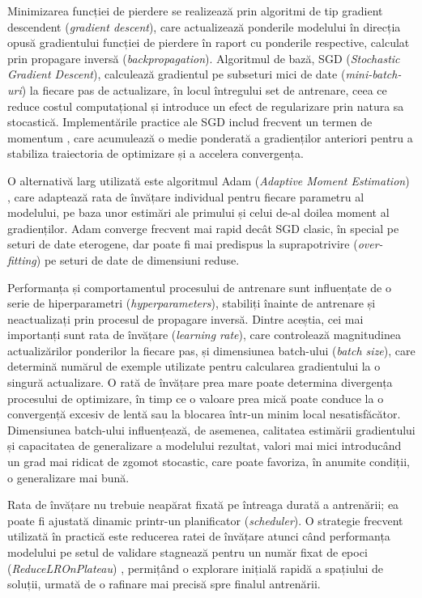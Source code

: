 Minimizarea funcției de pierdere se realizează prin algoritmi de tip gradient descendent (\textit{gradient descent}), care actualizează ponderile modelului în direcția opusă gradientului funcției de pierdere în raport cu ponderile respective, calculat prin propagare inversă (\textit{backpropagation}). Algoritmul de bază, SGD (\textit{Stochastic Gradient Descent}), calculează gradientul pe subseturi mici de date (\textit{mini-batch-uri}) la fiecare pas de actualizare, în locul întregului set de antrenare, ceea ce reduce costul computațional și introduce un efect de regularizare prin natura sa stocastică. Implementările practice ale SGD includ frecvent un termen de momentum \cite{pytorch_sgd}, care acumulează o medie ponderată a gradienților anteriori pentru a stabiliza traiectoria de optimizare și a accelera convergența.

O alternativă larg utilizată este algoritmul Adam (\textit{Adaptive Moment Estimation}) \cite{kingma2014adam}, care adaptează rata de învățare individual pentru fiecare parametru al modelului, pe baza unor estimări ale primului și celui de-al doilea moment al gradienților. Adam converge frecvent mai rapid decât SGD clasic, în special pe seturi de date eterogene, dar poate fi mai predispus la suprapotrivire ({\it over-fitting}) pe seturi de date de dimensiuni reduse.

Performanța și comportamentul procesului de antrenare sunt influențate de o serie de hiperparametri (\textit{hyperparameters}), stabiliți înainte de antrenare și neactualizați prin procesul de propagare inversă. Dintre aceștia, cei mai importanți sunt rata de învățare (\textit{learning rate}), care controlează magnitudinea actualizărilor ponderilor la fiecare pas, și dimensiunea batch-ului (\textit{batch size}), care determină numărul de exemple utilizate pentru calcularea gradientului la o singură actualizare. O rată de învățare prea mare poate determina divergența procesului de optimizare, în timp ce o valoare prea mică poate conduce la o convergență excesiv de lentă sau la blocarea într-un minim local nesatisfăcător. Dimensiunea batch-ului influențează, de asemenea, calitatea estimării gradientului și capacitatea de generalizare a modelului rezultat, valori mai mici introducând un grad mai ridicat de zgomot stocastic, care poate favoriza, în anumite condiții, o generalizare mai bună.

Rata de învățare nu trebuie neapărat fixată pe întreaga durată a antrenării; ea poate fi ajustată dinamic printr-un planificator (\textit{scheduler}). O strategie frecvent utilizată în practică este reducerea ratei de învățare atunci când performanța modelului pe setul de validare stagnează pentru un număr fixat de epoci (\textit{ReduceLROnPlateau}) \cite{pytorch_reducelronplateau}, permițând o explorare inițială rapidă a spațiului de soluții, urmată de o rafinare mai precisă spre finalul antrenării.

